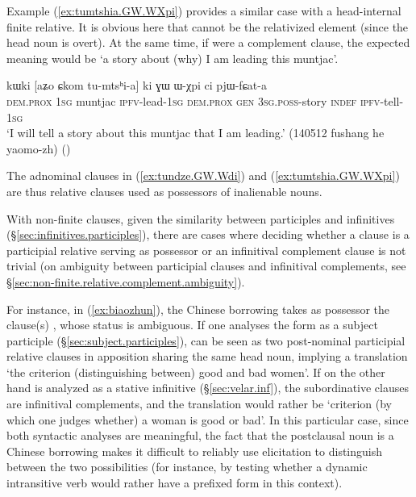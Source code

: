 Example (\ref{ex:tumtshia.GW.WXpi}) provides a similar case with a head-internal finite relative. It is obvious here that  cannot be the relativized element (since the head noun  is overt). At the same time, if  were a complement clause, the expected meaning would be `a story about (why) I am leading this muntjac'. 

\begin{exe}
\ex  \label{ex:tumtshia.GW.WXpi}
\gll kɯki [aʑo ɕkom tu-mtsʰi-a] ki ɣɯ ɯ-χpi ci pjɯ-fɕat-a \\
\textsc{dem}.\textsc{prox} \textsc{1sg} muntjac \textsc{ipfv}-lead-\textsc{1sg} \textsc{dem}.\textsc{prox} \textsc{gen} \textsc{3sg}.\textsc{poss}-story \textsc{indef} \textsc{ipfv}-tell-\textsc{1sg} \\
\glt `I will tell a story about this muntjac that I am leading.' (140512 fushang he yaomo-zh)
()
\end{exe}

The adnominal clauses in (\ref{ex:tundze.GW.Wdi}) and (\ref{ex:tumtshia.GW.WXpi}) are thus relative clauses used as possessors of inalienable nouns.

With non-finite clauses, given the similarity between participles and infinitives (§\ref{sec:infinitives.participles}), there are cases where deciding whether a clause is a participial relative serving as possessor or an infinitival complement clause is not trivial (on ambiguity between participial clauses and infinitival complements, see §\ref{sec:non-finite.relative.complement.ambiguity}). 

For instance, in (\ref{ex:biaozhun}), the Chinese borrowing   takes as possessor the clause(s) , whose status is ambiguous. If one analyses the form  as a subject participle (§\ref{sec:subject.participles}),  can be seen as two post-nominal participial relative clauses in apposition sharing the same head noun, implying a translation `the criterion (distinguishing between) good and bad women'. If on the other hand  is analyzed as a stative infinitive (§\ref{sec:velar.inf}), the subordinative clauses are infinitival complements, and the translation would rather be `criterion (by which one judges whether) a woman is good or bad'. In this particular case, since both syntactic analyses are meaningful, the fact that the postclausal noun is a Chinese borrowing makes it difficult to reliably use elicitation to distinguish between the two possibilities (for instance, by testing whether a dynamic intransitive verb would rather have a  prefixed form in this context).

